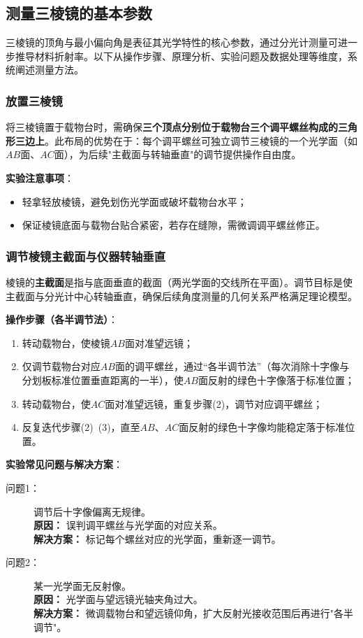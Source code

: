 \documentclass[11pt]{article}
\begin{document}
\subsection{测量三棱镜的基本参数}
三棱镜的顶角与最小偏向角是表征其光学特性的核心参数，通过分光计测量可进一步推导材料折射率。以下从操作步骤、原理分析、实验问题及数据处理等维度，系统阐述测量方法。

\subsubsection{放置三棱镜}
将三棱镜置于载物台时，需确保\textbf{三个顶点分别位于载物台三个调平螺丝构成的三角形三边上}。此布局的优势在于：每个调平螺丝可独立调节三棱镜的一个光学面（如\(AB\)面、\(AC\)面），为后续"主截面与转轴垂直"的调节提供操作自由度。

\textbf{实验注意事项}：
\begin{itemize}
    \item 轻拿轻放棱镜，避免划伤光学面或破坏载物台水平；
    \item 保证棱镜底面与载物台贴合紧密，若存在缝隙，需微调调平螺丝修正。
\end{itemize}

\subsubsection{调节棱镜主截面与仪器转轴垂直}
棱镜的\textbf{主截面}是指与底面垂直的截面（两光学面的交线所在平面）。调节目标是使主截面与分光计中心转轴垂直，确保后续角度测量的几何关系严格满足理论模型。

\textbf{操作步骤（各半调节法）}：
\begin{enumerate}[label=(\arabic*), itemsep=0.5ex]
    \item 转动载物台，使棱镜\(AB\)面对准望远镜；
    \item 仅调节载物台对应\(AB\)面的调平螺丝，通过“各半调节法”（每次消除十字像与分划板标准位置垂直距离的一半），使\(AB\)面反射的绿色十字像落于标准位置；
    \item 转动载物台，使\(AC\)面对准望远镜，重复步骤(2)，调节对应调平螺丝；
    \item 反复迭代步骤(2)~(3)，直至\(AB\)、\(AC\)面反射的绿色十字像均能稳定落于标准位置。
\end{enumerate}

\textbf{实验常见问题与解决方案}：
\begin{description}
    \item[问题1：] 调节后十字像偏离无规律。\\
    \textbf{原因：} 误判调平螺丝与光学面的对应关系。\\
    \textbf{解决方案：} 标记每个螺丝对应的光学面，重新逐一调节。
    
    \item[问题2：] 某一光学面无反射像。\\
    \textbf{原因：} 光学面与望远镜光轴夹角过大。\\
    \textbf{解决方案：} 微调载物台和望远镜仰角，扩大反射光接收范围后再进行"各半调节"。
\end{description}
\end{document}

